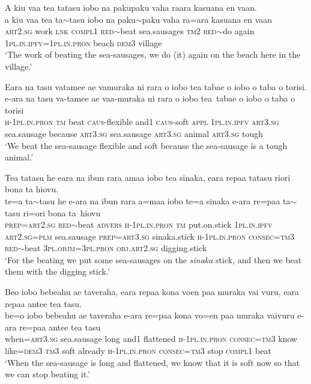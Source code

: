 \ea\label{ex:text32-12}
A kiu vaa tea tatasu iobo na pakupaku vaha raara kasuana en vaan.\\
\gll a	kiu	vaa	tea	ta{$\sim$}tasu	iobo	na	paku{$\sim$}paku	vaha	ra=ara	kasuana	en	vaan\\
     \textsc{art}2.\textsc{sg}	work	\textsc{lnk}	\textsc{compl}1	\textsc{red}{$\sim$}beat	sea.sausages	\textsc{tm}2	\textsc{red}{$\sim$}do	again	1\textsc{pl}.\textsc{in}.\textsc{ipfv}=1\textsc{pl}.\textsc{in}.\textsc{pron}	beach	\textsc{dem}3	village\\
\glt `The work of beating the sea-sausages, we do (it) again on the beach here in the village.'
\z

\ea\label{ex:text32-13}
Eara na tasu vatamee ae vamuraka ni rara o iobo tea tabae o iobo o taba o torisi.\\
\gll e-ara	na	tasu	va-tamee	ae	vaa-muraka	ni	rara	o	iobo	tea~tabae	o	iobo	o	taba	o	torisi\\
     \textsc{h}-1\textsc{pl}.\textsc{in}.\textsc{pron}	\textsc{tm}	beat	\textsc{caus}-flexible	and1	\textsc{caus}-soft	\textsc{appl}	1\textsc{pl}.\textsc{in}.\textsc{ipfv}	\textsc{art}3.\textsc{sg}	sea.sausage	because	\textsc{art}3.\textsc{sg}	sea.sausage	\textsc{art}3.\textsc{sg}	animal	\textsc{art}3.\textsc{sg}	tough\\
\glt `We beat the sea-sausage flexible and soft because the sea-sausage is a tough animal.'
\z

\ea\label{ex:text32-14}
Tea tatasu he eara na ibun rara amaa iobo tea sinaka, eara repaa tatasu riori bona ta hiovu.\\
\gll te=a	ta{$\sim$}tasu	he	e-ara	na	ibun	rara	a=maa	iobo	te=a	sinaka	e-ara	re=paa	ta{$\sim$}tasu	ri=ori	bona	ta~hiovu\\
     \textsc{prep}=\textsc{art}2.\textsc{sg}	\textsc{red}{$\sim$}beat	\textsc{advers}	\textsc{h}-1\textsc{pl}.\textsc{in}.\textsc{pron}	\textsc{tm}	put.on.stick	1\textsc{pl}.\textsc{in}.\textsc{ipfv}	\textsc{art}2.\textsc{sg}=\textsc{plm}	sea.sausage	\textsc{prep}=\textsc{art}3.\textsc{sg}	sinaka.stick	\textsc{h}-1\textsc{pl}.\textsc{in}.\textsc{pron}	\textsc{consec}=\textsc{tm}3	\textsc{red}{$\sim$}beat	3\textsc{pl}.\textsc{objm}=3\textsc{pl}.\textsc{pron}	\textsc{obj}.\textsc{art}2.\textsc{sg}	digging.stick\\
\glt `For the beating we put some sea-sausages on the \textit{sinaka} stick, and then we beat them with the digging stick.'
\z

\ea\label{ex:text32-15}
Beo iobo bebeahu ae taveraha, eara repaa kona voen paa muraka vai vuru, eara repaa antee tea tasu.\\
\gll be=o	iobo	bebeahu	ae	taveraha	e-ara	re=paa	kona	vo=en	paa	muraka	vaivuru	e-ara	re=paa	antee	tea	tasu\\
     when=\textsc{art}3.\textsc{sg}	sea.sausage	long	and1	flattened	\textsc{h}-1\textsc{pl}.\textsc{in}.\textsc{pron}	\textsc{consec}=\textsc{tm}3	know	like=\textsc{dem}3	\textsc{tm}3	soft	already	\textsc{h}-1\textsc{pl}.\textsc{in}.\textsc{pron}	\textsc{consec}=\textsc{tm}3	stop	\textsc{compl}1	beat\\
\glt `When the sea-sausage is long and flattened, we know that it is soft now so that we can stop beating it.'
\z

